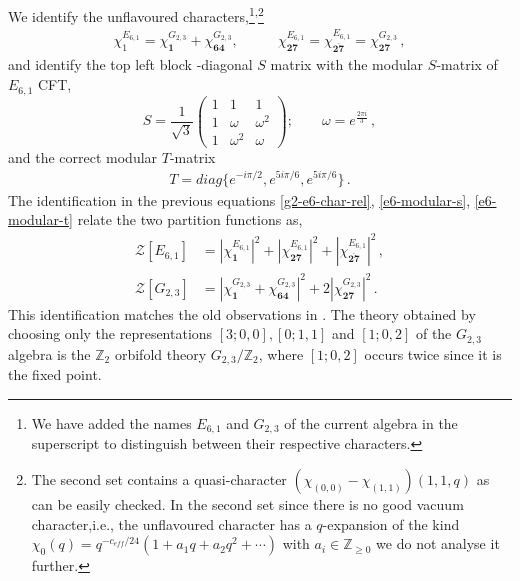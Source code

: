 \documentclass[a4paper,12pt]{article}
\begin{document}
We identify the unflavoured characters,\footnote{We have added the names $E_{6,1}$ and $G_{2,3}$ of the current algebra in the superscript to distinguish between their respective characters.}\textsuperscript{,}\footnote{The second set contains a quasi-character $(\chi_{(0,0)}-\chi_{(1,1)})(1,1,q)$ as can be easily checked. In the second set since there is no good vacuum character,i.e., the unflavoured character has a $q$-expansion of the kind $\chi_0(q)=q^{-c_{eff}/24}(1+a_1q+a_2q^2+\cdots)$ with $a_i\in\mathbb{Z}_{\geq 0}$ we do not analyse it further.}
\begin{align}\label{g2-e6-char-rel}
    \chi^{E_{6,1}}_1 =\chi^{G_{2,3}}_\mathbf{1}+\chi^{G_{2,3}}_\mathbf{64}, &\qquad \chi^{E_{6,1}}_\mathbf{27}=\chi^{E_{6,1}}_\mathbf{\overline{27}}=\chi^{G_{2,3}}_\mathbf{27}\, ,
    \end{align}
    and identify the top left block -diagonal $S$ matrix with the modular $S$-matrix of $E_{6,1}$ CFT,
\begin{equation}\label{e6-modular-s}
    S=\frac{1}{\sqrt{3}}\begin{pmatrix}
1 & 1 & 1\\
1 & \omega & \omega^2 \\
1 & \omega^2 & \omega
\end{pmatrix}; \qquad \omega=e^{\frac{2\pi i}{3}}\, ,
\end{equation}
%
and the correct modular $T$-matrix
%
\begin{align}\label{e6-modular-t}
    T=diag\{e^{-i\pi/2},e^{5i\pi/6},e^{5i\pi/6}\}\, .
\end{align}
%
The identification in the previous equations \eqref{g2-e6-char-rel}, \eqref{e6-modular-s}, \eqref{e6-modular-t} relate the two partition functions as,
%
\begin{align}
    \mathcal{Z}[E_{6,1}]&=|\chi^{E_{6,1}}_\mathbf{1}|^2+|\chi^{E_{6,1}}_\mathbf{27}|^2+|\chi^{E_{6,1}}_\mathbf{\overline{27}}|^2\, ,\nonumber\\
    \mathcal{Z}[G_{2,3}]&=|\chi^{G_{2,3}}_\mathbf{1}+\chi^{G_{2,3}}_\mathbf{64}|^2+2|\chi^{G_{2,3}}_\mathbf{27}|^2\, .
\end{align}
%
This identification matches the old  observations in \cite{Christe:1988vc,Coquereaux:2010we}. The theory obtained by choosing only the representations $[3;0,0], [0;1,1]$ and $[1;0,2]$ of the $G_{2,3}$ algebra is the $\mathbb{Z}_2$ orbifold theory $G_{2,3}/\mathbb{Z}_2$, where $[1;0,2]$ occurs twice since it is the fixed point. 
\end{document}
